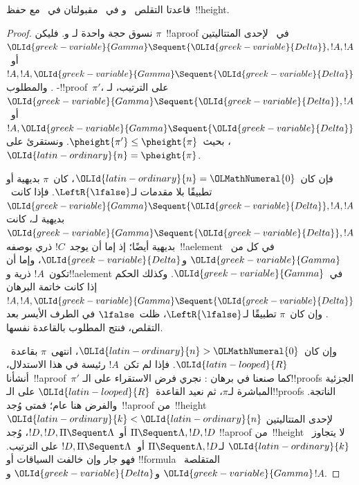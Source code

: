 \documentclass[../../../include/open-logic-section]{subfiles}
\begin{document}
\begin{prop}
قاعدتا التقلص~\LeftR{\Contraction} و\RightR{\Contraction} في~
مقبولتان في~ مع حفظ~!!{height}.
\end{prop}

\begin{proof}
نسوق حجة واحدة لـ\RightR{\Contraction} و\LeftR{\Contraction}. فليكن
$\pi$~!!a{proof} في~ لإحدى المتتاليتين
${\OLId{greek-variable}{Gamma}}\Sequent{\OLId{greek-variable}{Delta}},!A,!A$ أو~$!A,!A,{\OLId{greek-variable}{Gamma}}\Sequent{\OLId{greek-variable}{Delta}}$. والمطلوب
-!!{proof}~$\pi'$، على الترتيب، لـ${\OLId{greek-variable}{Gamma}}\Sequent{\OLId{greek-variable}{Delta}},!A$
أو~$!A,{\OLId{greek-variable}{Gamma}}\Sequent{\OLId{greek-variable}{Delta}}$، بحيث~$\pheight{\pi'}\leq
\pheight{\pi}$. ونستقرئ على~${\OLId{latin-ordinary}{n}}=\pheight{\pi}$.

فإن كان~${\OLId{latin-ordinary}{n}}={\OLMathNumeral{0}}$، كان~$\pi$ بديهية أو تطبيقًا بلا مقدمات لـ$\LeftR{\lfalse}$.
فإذا كانت~${\OLId{greek-variable}{Gamma}}\Sequent{\OLId{greek-variable}{Delta}},!A,!A$ بديهية لـ، كانت
${\OLId{greek-variable}{Gamma}}\Sequent{\OLId{greek-variable}{Delta}},!A$ بديهية أيضًا؛ إذ إما أن يوجد~$!C$ ذري
بوصفه~!!a{element} في كل من~${\OLId{greek-variable}{Gamma}}$ و${\OLId{greek-variable}{Delta}}$، وإما أن تكون~$!A$ ذرية
و!!a{element} في~${\OLId{greek-variable}{Gamma}}$. وكذلك الحكم إذا كانت خاتمة البرهان
$!A,!A,{\OLId{greek-variable}{Gamma}}\Sequent{\OLId{greek-variable}{Delta}}$. وإن كان~$\pi$ تطبيقًا لـ$\LeftR{\lfalse}$،
ظلت~$\lfalse$ في الطرف الأيسر بعد التقلص، فنتج المطلوب بالقاعدة نفسها.

وإن كان~${\OLId{latin-ordinary}{n}}>{\OLMathNumeral{0}}$، انتهى~$\pi$ بقاعدة~${\OLId{latin-looped}{R}}$. فإذا لم تكن~$!A$ رئيسة في هذا
الاستدلال، أنشأنا~!!a{proof}~$\pi'$ كما صنعنا في برهان
: نجري فرض الاستقراء على الـ!!{proof}s الجزئية
المباشرة لـ$\pi$، ثم نعيد القاعدة~${\OLId{latin-looped}{R}}$ على الـ!!{proof}s الناتجة. والفرض هنا عام؛
فمتى وُجد~!!a{proof} من~!!{height}~${\OLId{latin-ordinary}{k}}<{\OLId{latin-ordinary}{n}}$ لإحدى المتتاليتين
$\Pi\Sequent\Lambda,!D,!D$ أو~$!D,!D,\Pi\Sequent\Lambda$، وُجد
!!a{proof} من~!!{height} لا يتجاوز~${\OLId{latin-ordinary}{k}}$ لـ$\Pi\Sequent\Lambda,!D$
أو~$!D,\Pi\Sequent\Lambda$ على الترتيب. فهو جار وإن خالفت السياقات أو
!!{formula} المتقلصة~${\OLId{greek-variable}{Gamma}}$ و${\OLId{greek-variable}{Delta}}$ و$!A$.


\end{proof}
\end{document}
